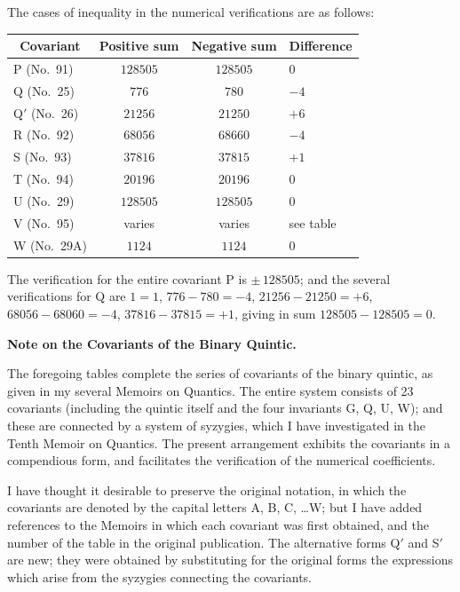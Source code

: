 \documentclass[11pt,a4paper]{book}
\begin{document}
\clearpage
\setcounter{page}{289}

The cases of inequality in the numerical verifications are as follows:

\begin{center}
\begin{tabular}{|l|c|c|l|}
\hline
\multicolumn{1}{|c|}{Covariant} & Positive sum & Negative sum & \multicolumn{1}{c|}{Difference} \\
\hline
P (No.\ 91) & $128505$ & $128505$ & $0$ \\
Q (No.\ 25) & $776$ & $780$ & $-4$ \\
Q$'$ (No.\ 26) & $21256$ & $21250$ & $+6$ \\
R (No.\ 92) & $68056$ & $68660$ & $-4$ \\
S (No.\ 93) & $37816$ & $37815$ & $+1$ \\
T (No.\ 94) & $20196$ & $20196$ & $0$ \\
U (No.\ 29) & $128505$ & $128505$ & $0$ \\
V (No.\ 95) & varies & varies & see table \\
W (No.\ 29A) & $1124$ & $1124$ & $0$ \\
\hline
\end{tabular}
\end{center}

The verification for the entire covariant P is $\pm\,128505$; and the several verifications for Q are $1=1$, $776-780=-4$, $21256-21250=+6$, $68056-68060=-4$, $37816-37815=+1$, giving in sum $128505-128505=0$.

\clearpage
\setcounter{page}{290}

\begin{center}
\textbf{Note on the Covariants of the Binary Quintic.}
\end{center}

The foregoing tables complete the series of covariants of the binary quintic, as given in my several Memoirs on Quantics. The entire system consists of 23 covariants (including the quintic itself and the four invariants G, Q, U, W); and these are connected by a system of syzygies, which I have investigated in the Tenth Memoir on Quantics. The present arrangement exhibits the covariants in a compendious form, and facilitates the verification of the numerical coefficients.

I have thought it desirable to preserve the original notation, in which the covariants are denoted by the capital letters A, B, C, \ldots W; but I have added references to the Memoirs in which each covariant was first obtained, and the number of the table in the original publication. The alternative forms Q$'$ and S$'$ are new; they were obtained by substituting for the original forms the expressions which arise from the syzygies connecting the covariants.
\end{document}
